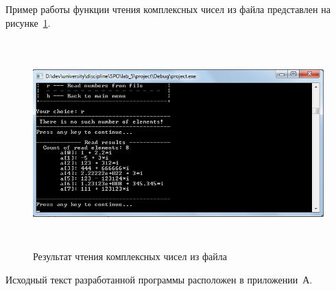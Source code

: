 Пример работы функции чтения комплексных чисел из файла представлен на рисунке~\ref{fig:read_results}.

\begin{figure}[htbp]
  \centering
  \includegraphics[width=150mm,height=80mm]{img/read_results}
  \caption{Результат чтения комплексных чисел из файла}\label{fig:read_results}
\end{figure}

Исходный текст разработанной программы расположен в приложении~А.

\newpage